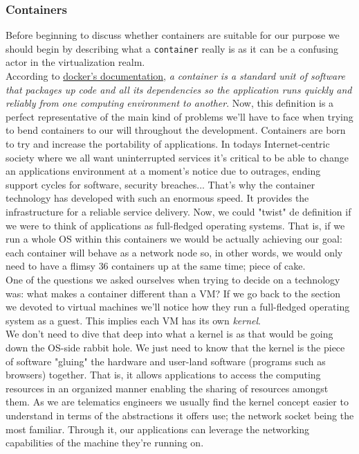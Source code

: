             \subsubsection{Containers}
                Before beginning to discuss whether containers are suitable for our purpose we should begin by describing what a \texttt{container} really is as it can be a confusing actor in the virtualization realm.\\

                According to \href{https://www.docker.com/resources/what-container}{docker's documentation}, \textit{a container is a standard unit of software that packages up code and all its dependencies so the application runs quickly and reliably from one computing environment to another}. Now, this definition is a perfect representative of the main kind of problems we'll have to face when trying to bend containers to our will throughout the development. Containers are born to try and increase the portability of applications. In todays Internet-centric society where we all want uninterrupted services it's critical to be able to change an applications environment at a moment's notice due to outrages, ending support cycles for software, security breaches... That's why the container technology has developed with such an enormous speed. It provides the infrastructure for a reliable service delivery. Now, we could "twist" de definition if we were to think of applications as full-fledged operating systems. That is, if we run a whole OS within this containers we would be actually achieving our goal: each container will behave as a network node so, in other words, we would only need to have a flimsy $36$ containers up at the same time; piece of cake.\\

                One of the questions we asked ourselves when trying to decide on a technology was: what makes a container different than a VM? If we go back to the section we devoted to virtual machines we'll notice how they run a full-fledged operating system as a guest. This implies each VM has its own \textit{kernel}.\\

                We don't need to dive that deep into what a kernel is as that would be going down the OS-side rabbit hole. We just need to know that the kernel is the piece of software "gluing" the hardware and user-land software (programs such as browsers) together. That is, it allows applications to access the computing resources in an organized manner enabling the sharing of resources amongst them. As we are telematics engineers we usually find the kernel concept easier to understand in terms of the abstractions it offers use; the network socket being the most familiar. Through it, our applications can leverage the networking capabilities of the machine they're running on.\\

